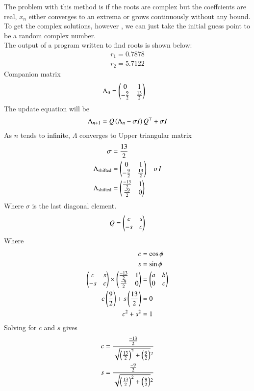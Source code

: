 \documentclass[journal]{IEEEtran}
\begin{document}
The problem with this method is if the roots are complex but the coeffcients are real, $x_n$ either converges to an extrema or grows continuously without any bound.
To get the complex solutions, however , we can just take the initial guess point to be a 
random complex number.\\
The output of a program written to find roots is shown below:
\begin{align}
	r_1 = 0.7878\\
	r_2 = 5.7122
\end{align}
Companion matrix
\begin{align}
\Lambda_{0} &= \begin{pmatrix}0 & 1\\-\frac{9}{2} & \frac{13}{2}\end{pmatrix}
\end{align}
The update equation will be
\begin{align}
\Lambda_{n+1} &= Q\left(\Lambda_{n}-\sigma I\right)Q^\top + \sigma I\\
\end{align}
As $n$ tends to infinite, $\Lambda$ converges to Upper triangular matrix
\begin{align}
\sigma &= \frac{13}{2}\\
\Lambda_{\text{shifted}} &= \begin{pmatrix}0 & 1\\-\frac{9}{2} & \frac{13}{2}\end{pmatrix} - \sigma I\\
\Lambda_{\text{shifted}} &= \begin{pmatrix}\frac{-13}{2} & 1\\ \frac{-9}{2} & 0\end{pmatrix}
\end{align}
Where $\sigma$ is the last diagonal element.
\begin{align}
Q &= \begin{pmatrix}c & s\\-s & c\end{pmatrix}\\
\end{align}
Where
\begin{align}
c &= \cos{\phi}\\
s &= \sin{\phi}\\
	\begin{pmatrix}c & s\\-s & c\end{pmatrix} \times \begin{pmatrix}\frac{-13}{2} & 1\\ \frac{-9}{2} & 0\end{pmatrix} &= \begin{pmatrix}a & b\\ 0 & c\end{pmatrix}\\
	c\left(\frac{9}{2}\right) + s\left(\frac{13}{2}\right) &= 0\\
	c^2+s^2 &= 1
\end{align}
Solving for $c$ and $s$ gives
\begin{align}
	c &= \frac{\frac{-13}{2}}{\sqrt{\left(\frac{13}{2}\right)^2+\left(\frac{9}{2}\right)}^2}\\
	s &= \frac{\frac{-9}{2}}{\sqrt{\left(\frac{13}{2}\right)^2+\left(\frac{9}{2}\right)}^2}
\end{align}
\end{document}
